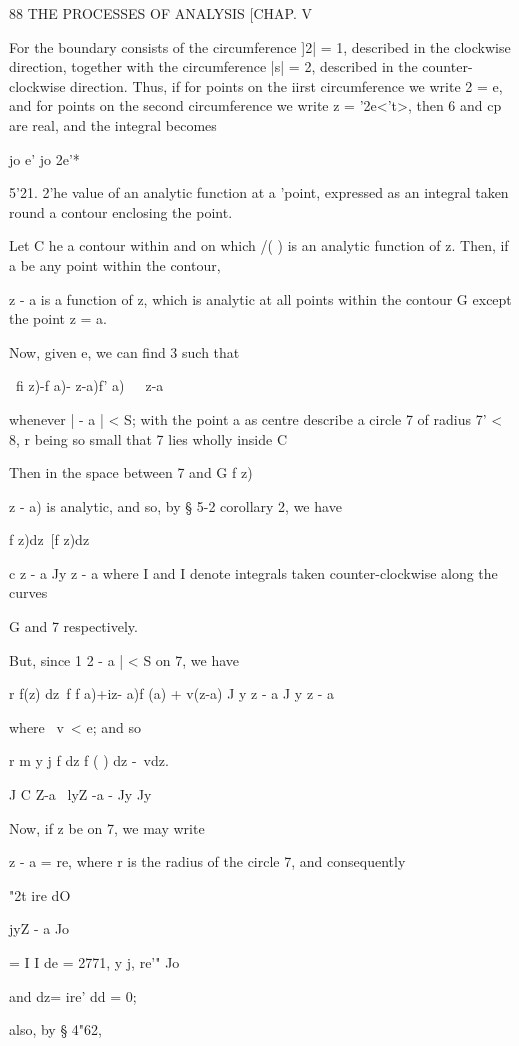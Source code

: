 {  

88 THE PROCESSES OF ANALYSIS [CHAP. V

For the boundary consists of the circumference ]2| = 1, described in
the clockwise direction, together with the circumference |s| = 2,
described in the counter-clockwise direction. Thus, if for points on
the iirst circumference we write 2 = e, and for points on the second
circumference we write z = '2e<'t>, then 6 and cp are real, and the
integral becomes

jo e' jo 2e'*

5'21. 2'he value of an analytic function at a 'point, expressed as an
integral taken round a contour enclosing the point.

Let C he a contour within and on which /( ) is an analytic function of
z. Then, if a be any point within the contour,

z - a is a function of z, which is analytic at all points within the
contour G except the point z = a.

Now, given e, we can find 3 such that

\ fi z)-f a)- z-a)f' a)\ \ \ z-a\

whenever | - a | < S; with the point a as centre describe a circle 7
of radius 7' < 8, r being so small that 7 lies wholly inside C

Then in the space between 7 and G f z)\ \ {z - a) is analytic, and so,
by § 5-2 corollary 2, we have

f z)dz\ [f z)dz

c z - a Jy z - a where I and I denote integrals taken
counter-clockwise along the curves

G and 7 respectively.

But, since 1 2 - a | < S on 7, we have

r f(z) dz\ f f a)+iz- a)f (a) + v(z-a) J y z - a J y z - a

where \ v\ < e; and so

r m y j f dz f ( ) dz -\ vdz.

J C Z-a \ lyZ -a - Jy Jy

Now, if z be on 7, we may write

z - a = re, where r is the radius of the circle 7, and consequently

"2t ire dO

jyZ - a Jo

= I I de = 2771, y j, re'" Jo

and dz= ire' dd = 0;

also, by § 4"62,

}}
